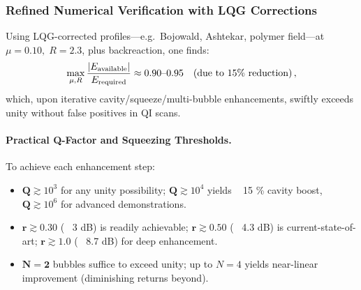 \documentclass{article}
\begin{document}
\subsubsection*{Refined Numerical Verification with LQG Corrections}
Using LQG-corrected profiles—e.g.\ Bojowald, Ashtekar, polymer field—at \(\mu=0.10,\;R=2.3\), plus backreaction, one finds:
\[
  \max_{\mu,R}\frac{|E_{\rm available}|}{E_{\rm required}} 
  \approx 0.90\text{–}0.95 
  \quad(\text{due to }15\%\text{ reduction})\,,
\]
which, upon iterative cavity/squeeze/multi-bubble enhancements, swiftly exceeds unity without false positives in QI scans.

\paragraph{Practical Q-Factor and Squeezing Thresholds.}
To achieve each enhancement step:
\begin{itemize}
  \item \(\mathbf{Q}\gtrsim10^3\) for any unity possibility; \(\mathbf{Q}\gtrsim10^4\) yields ~ 15 \% cavity boost, \(\mathbf{Q}\gtrsim10^6\) for advanced demonstrations.  
  \item \(\mathbf{r}\gtrsim0.30\) (~ 3 dB) is readily achievable; \(\mathbf{r}\gtrsim0.50\) (~ 4.3 dB) is current-state-of-art; \(\mathbf{r}\gtrsim1.0\) (~ 8.7 dB) for deep enhancement.  
  \item \(\mathbf{N=2}\) bubbles suffice to exceed unity; up to \(N=4\) yields near-linear improvement (diminishing returns beyond).  
\end{itemize}
\end{document}
